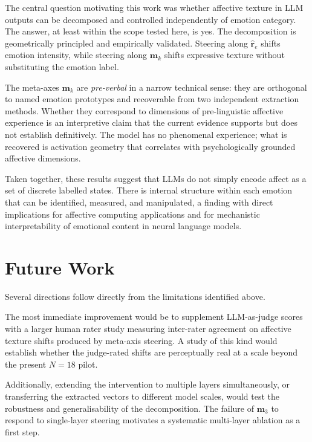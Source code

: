 The central question motivating this work was whether affective texture in LLM outputs can be decomposed and controlled independently of emotion category. The answer, at least within the scope tested here, is yes. The decomposition is geometrically principled and empirically validated. Steering along $\hat{\mathbf{r}}_e$ shifts emotion intensity, while steering along $\mathbf{m}_k$ shifts expressive texture without substituting the emotion label.\par

The meta-axes $\mathbf{m}_k$ are \emph{pre-verbal} in a narrow technical sense: they are orthogonal to named emotion prototypes and recoverable from two independent extraction methods. Whether they correspond to dimensions of pre-linguistic affective experience is an interpretive claim that the current evidence supports but does not establish definitively. The model has no phenomenal experience; what is recovered is activation geometry that correlates with psychologically grounded affective dimensions.\par

Taken together, these results suggest that LLMs do not simply encode affect as a set of discrete labelled states. There is internal structure within each emotion that can be identified, measured, and manipulated, a finding with direct implications for affective computing applications and for mechanistic interpretability of emotional content in neural language models.

\section{Future Work}
\label{sec:future-work}

Several directions follow directly from the limitations identified above.

The most immediate improvement would be to supplement LLM-as-judge scores with a larger human rater study measuring inter-rater agreement on affective texture shifts produced by meta-axis steering. A study of this kind would establish whether the judge-rated shifts are perceptually real at a scale beyond the present $N = 18$ pilot. \par

Additionally, extending the intervention to multiple layers simultaneously, or transferring the extracted vectors to different model scales, would test the robustness and generalisability of the decomposition. The failure of $\mathbf{m}_3$ to respond to single-layer steering motivates a systematic multi-layer ablation as a first step. \par

